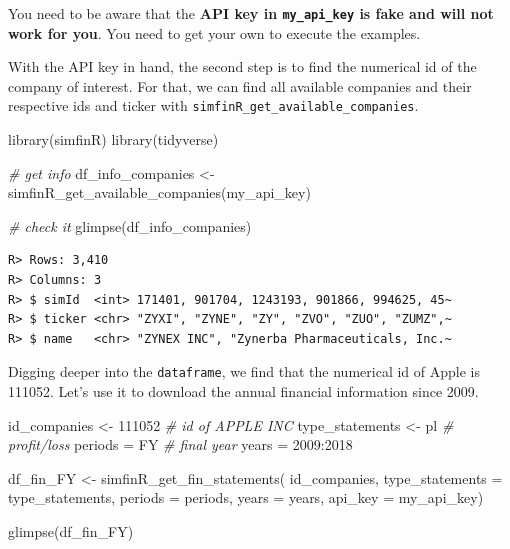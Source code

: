 \documentclass[
  12pt,
]{book}
\newenvironment{Shaded}{\begin{snugshade}}{\end{snugshade}}
\newcommand{\AttributeTok}[1]{\textcolor[rgb]{0.61,0.61,0.61}{#1}}
\newcommand{\CommentTok}[1]{\textcolor[rgb]{0.37,0.37,0.37}{\textit{#1}}}
\newcommand{\DecValTok}[1]{\textcolor[rgb]{0.06,0.06,0.06}{#1}}
\newcommand{\FunctionTok}[1]{\textcolor[rgb]{0,0,0}{#1}}
\newcommand{\NormalTok}[1]{#1}
\newcommand{\OtherTok}[1]{\textcolor[rgb]{0.37,0.37,0.37}{#1}}
\newcommand{\SpecialCharTok}[1]{\textcolor[rgb]{0,0,0}{#1}}
\newcommand{\StringTok}[1]{\textcolor[rgb]{0.5,0.5,0.5}{#1}}
\begin{document}
You need to be aware that the \textbf{API key in \texttt{my\_api\_key} is fake and will not work for you}. You need to get your own to execute the examples.

With the API key in hand, the second step is to find the numerical id of the company of interest. For that, we can find all available companies and their respective ids and ticker with \texttt{simfinR\_get\_available\_companies}.

\begin{Shaded}
\begin{Highlighting}[]
\FunctionTok{library}\NormalTok{(simfinR)}
\FunctionTok{library}\NormalTok{(tidyverse)}

\CommentTok{\# get info}
\NormalTok{df\_info\_companies }\OtherTok{\textless{}{-}} \FunctionTok{simfinR\_get\_available\_companies}\NormalTok{(my\_api\_key)}

\CommentTok{\# check it}
\FunctionTok{glimpse}\NormalTok{(df\_info\_companies)}
\end{Highlighting}
\end{Shaded}

\begin{verbatim}
R> Rows: 3,410
R> Columns: 3
R> $ simId  <int> 171401, 901704, 1243193, 901866, 994625, 45~
R> $ ticker <chr> "ZYXI", "ZYNE", "ZY", "ZVO", "ZUO", "ZUMZ",~
R> $ name   <chr> "ZYNEX INC", "Zynerba Pharmaceuticals, Inc.~
\end{verbatim}

Digging deeper into the \texttt{dataframe}, we find that the numerical id of Apple is 111052. Let's use it to download the annual financial information since 2009.

\begin{Shaded}
\begin{Highlighting}[]
\NormalTok{id\_companies }\OtherTok{\textless{}{-}} \DecValTok{111052} \CommentTok{\# id of APPLE INC}
\NormalTok{type\_statements }\OtherTok{\textless{}{-}} \StringTok{\textquotesingle{}pl\textquotesingle{}} \CommentTok{\# profit/loss}
\NormalTok{periods }\OtherTok{=} \StringTok{\textquotesingle{}FY\textquotesingle{}} \CommentTok{\# final year}
\NormalTok{years }\OtherTok{=} \DecValTok{2009}\SpecialCharTok{:}\DecValTok{2018}

\NormalTok{df\_fin\_FY }\OtherTok{\textless{}{-}} \FunctionTok{simfinR\_get\_fin\_statements}\NormalTok{(}
\NormalTok{  id\_companies,}
  \AttributeTok{type\_statements =}\NormalTok{ type\_statements,}
  \AttributeTok{periods =}\NormalTok{ periods,}
  \AttributeTok{years =}\NormalTok{ years,}
  \AttributeTok{api\_key =}\NormalTok{ my\_api\_key)}

\FunctionTok{glimpse}\NormalTok{(df\_fin\_FY)}
\end{Highlighting}
\end{Shaded}
\end{document}
